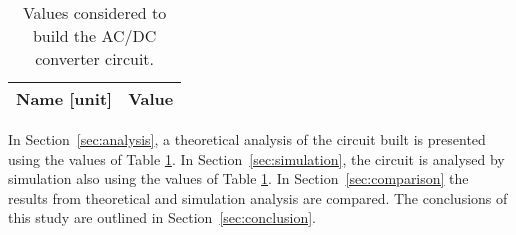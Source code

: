 \vspace{1.5cm}
\begin{table}[H]
	\centering
	\begin{tabular}{|l|r|}
		\hline    
		{\bf Name [unit]} & {\bf Value} \\ \hline
		
	\end{tabular}
	\caption{Values considered to build the AC/DC converter circuit.}
	\label{tab:values}
\end{table}

In Section~\ref{sec:analysis}, a theoretical analysis of the circuit built is presented using the values of Table \ref{tab:values}. In Section~\ref{sec:simulation}, the circuit is analysed by simulation also using the values of Table \ref{tab:values}. In Section~\ref{sec:comparison} the results from theoretical and simulation analysis are compared. The conclusions of this study are outlined in Section~\ref{sec:conclusion}.



